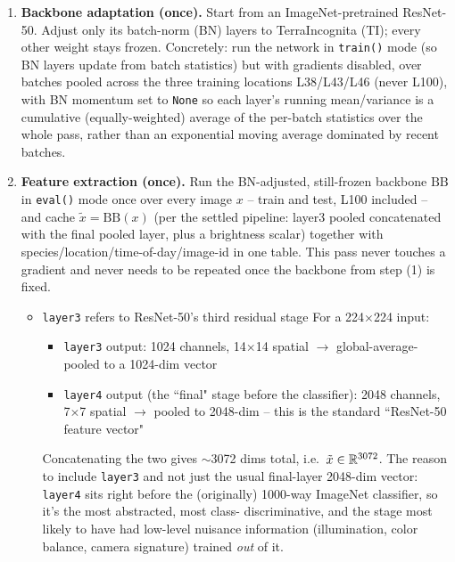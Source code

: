 \begin{enumerate}[label=(\arabic*),leftmargin=2em]
\item \textbf{Backbone adaptation (once).} Start from an ImageNet-pretrained ResNet-50. Adjust only its
      batch-norm (BN) layers to TerraIncognita (TI); every other weight stays frozen. 
      Concretely: run the network in
      \texttt{train()} mode (so BN layers update from batch statistics) but with gradients disabled,
      over batches pooled across the three training locations L38/L43/L46 (never L100), with BN 
      momentum set to \texttt{None} so each layer's running mean/variance is a cumulative 
      (equally-weighted) average of the per-batch statistics over the whole pass, rather than an 
      exponential moving average dominated by recent batches.
\item \textbf{Feature extraction (once).} Run the BN-adjusted, still-frozen backbone $\mathrm{BB}$ in
      \texttt{eval()} mode once over every image $x$ -- train and test, L100 included -- and cache
      $\tilde x=\mathrm{BB}(x)$ (per the settled pipeline: layer3 pooled concatenated with the final
      pooled layer, plus a brightness scalar) together with species/location/time-of-day/image-id in
      one table. This pass never touches a gradient and never needs to be repeated once the backbone
      from step (1) is fixed.
      \begin{itemize}
      \item \texttt{layer3} refers to ResNet-50's third residual stage 
      For a 224$\times$224 input:
      \begin{itemize} 
      \item \texttt{layer3} output: 1024 channels, 14$\times$14 spatial
	      $\rightarrow$ global-average-pooled to a 1024-dim vector
      \item \texttt{layer4} output (the ``final" stage before the classifier): 2048 channels, 7$\times$7 
	      spatial $\rightarrow$ pooled to 2048-dim -- this is the standard ``ResNet-50 feature vector"
	  \end{itemize}      
      Concatenating the two gives $\sim$3072 dims total, i.e.\ $\tilde x\in\mathbb{R}^{3072}$. The reason to
      include \texttt{layer3} and not just the usual final-layer 2048-dim vector: \texttt{layer4} 
      sits right before the (originally) 1000-way ImageNet classifier, so it's the most abstracted, 
      most class- \linebreak
      discriminative, and the stage most likely to have had low-level nuisance 
      information (illumination, color balance, camera signature) trained \textit{out} of it. 

\end{itemize}
\end{enumerate}
